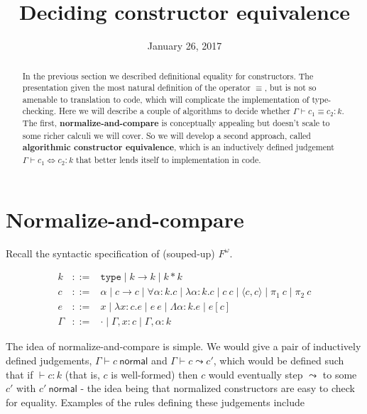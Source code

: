 \documentclass{article}
\title{Deciding constructor equivalence}
\date{January 26, 2017}
\newcommand{\type}{\ensuremath{\mathtt{type}}}
\begin{document}
\maketitle

\begin{abstract}
    In the previous section we described definitional equality for constructors.
    The presentation given the most natural definition of the operator $\equiv$,
    but is not so amenable to translation to code, which will complicate the
    implementation of type-checking. Here we will describe a couple of
    algorithms to decide whether $\Gamma \vdash c_1 \equiv c_2 : k$. The first,
    {\bf normalize-and-compare} is conceptually appealing but doesn't scale to
    some richer calculi we will cover. So we will develop a second approach,
    called {\bf algorithmic constructor equivalence}, which is an inductively
    defined judgement $\Gamma \vdash c_1 \iff c_2 : k$ that better lends itself
    to implementation in code.
\end{abstract}

\section{Normalize-and-compare}

\newcommand{\normal}[1]{#1 \ \mathsf{normal}}

Recall the syntactic specification of (souped-up) $F^\omega$.

\[
  \begin{array}{lcl}
    k & ::= & \type \mid k \to k \mid k * k\\
    c & ::= & \alpha \mid c \to c \mid \forall \alpha : k. c
        \mid \lambda \alpha : k. c \mid c\ c \mid \langle c, c \rangle \mid \pi_1 \ c \mid \pi_2 \ c \\
    e & ::= & x \mid \lambda x : c. e \mid e\ e \mid
            \Lambda \alpha : k. e \mid e[c]\\
    \Gamma & ::= & \cdot \mid \Gamma, x : c \mid \Gamma, \alpha : k
  \end{array}
\]

The idea of normalize-and-compare is simple. We would give a pair of
inductively defined judgements, $\Gamma \vdash \normal{c}$ and $\Gamma
\vdash c \leadsto c'$, which would be defined such that if $\vdash c : k$
(that is, $c$ is well-formed) then $c$ would eventually step $\leadsto$ to
some $c'$ with $\normal{c'}$ - the idea being that normalized constructors
are easy to check for equality. Examples of the rules defining these
judgements include
\end{document}
